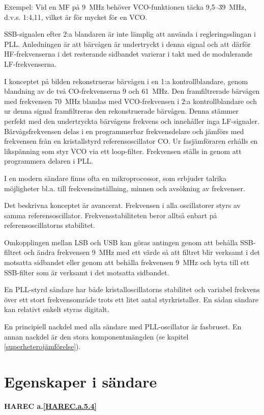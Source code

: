 Exempel: Vid en MF på 9~MHz behöver VCO-funktionen täcka 9,5--39~MHz,
d.v.s. 1:4,11, vilket är för mycket för en VCO.

SSB-signalen efter 2:a blandaren är inte lämplig att använda i
regleringsslingan i PLL. Anledningen är att bärvågen är undertryckt i
denna signal och att därför HF-frekvenserna i det resterande sidbandet
varierar i takt med de modulerande LF-frekvenserna.

I konceptet på bilden rekonstrueras bärvågen i en 1:a kontrollblandare,
genom blandning av de två CO-frekvenserna 9 och 61~MHz.
Den framfiltrerade bärvågen med frekvensen 70~MHz blandas med
VCO-frekvensen i 2:a kontrollblandare och ur denna signal
framfiltreras den rekonstruerade bärvågen. Denna stämmer perfekt med
den undertryckta bärvågens frekvens och innehåller inga
LF-signaler. Bärvågsfrekvensen delas i en programmerbar frekvensdelare
och jämförs med frekvensen från en kristallstyrd referensoscillator
CO. Ur fasjämföraren erhålls en likspänning som styr VCO via ett
loop-filter. Frekvensen ställs in genom att programmera delaren i PLL.

I en modern sändare finns ofta en mikroprocessor, som erbjuder talrika
möjligheter bl.a. till frekvensinställning, minnen och avsökning av
frekvenser.

Det beskrivna konceptet är avancerat.  Frekvensen i alla oscillatorer
styrs av samma referensoscillator. Frekvensstabiliteten beror alltså
enbart på referensoscillatorns stabilitet.

Omkopplingen mellan LSB och USB kan göras antingen genom att behålla
SSB-filtret och ändra frekvensen 9~MHz med ett värde så att filtret
blir verksamt i det motsatta sidbandet eller genom att behålla
frekvensen 9~MHz och byta till ett SSB-filter som är verksamt i det
motsatta sidbandet.

En PLL-styrd sändare har både kristalloscillatorns stabilitet och
variabel frekvens över ett stort frekvensområde trots ett litet antal
styrkristaller. En sådan sändare kan relativt enkelt styras digitalt.

En principiell nackdel med alla sändare med PLL-oscillator är
fasbruset. En annan nackdel är den stora komponentmängden
(se kapitel \ref{superheterojämförelse}).

\section{Egenskaper i sändare}
\textbf{HAREC
  a.\ref{HAREC.a.5.4}\label{myHAREC.a.5.4}
}

